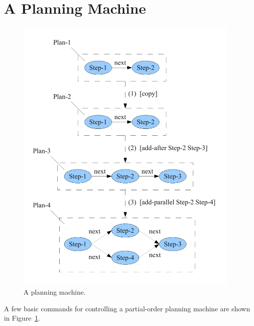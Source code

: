 \section{A Planning Machine}

\begin{figure}[bth]
  \center
  \includegraphics[width=11cm]{gfx/planning_machine}
  \caption[A planning machine.]{A planning machine.}
  \label{fig:planning_machine}
\end{figure}

A few basic commands for controlling a partial-order planning machine
are shown in Figure~\ref{fig:planning_machine}.


